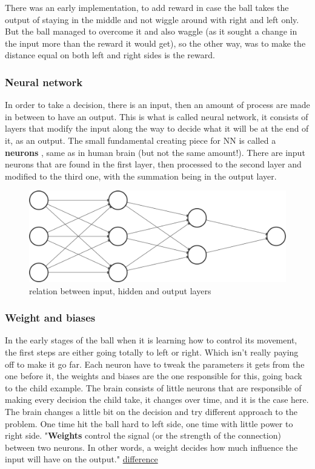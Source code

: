 There was an early implementation, to add reward in case the ball takes the output of staying in the middle and not wiggle around with right and left only. But the ball managed to overcome it and also waggle (as it sought a change in the input more than the reward it would get), so the other way, was to make the distance equal on both left and right sides is the reward.

\subsubsection{Neural network}
In order to take a decision, there is an input, then an amount of process are made in between to have an output. This is what is called neural network, it consists of layers that modify the input along the way to decide what it will be at the end of it, as an output. The small fundamental creating piece for NN is called a \textbf{neurons} , same as in human brain (but not the same amount!). There are input neurons that are found in the first layer, then processed to the second layer and modified to the third one, with the summation being in the output layer.

\begin{figure}
	\centering
	\includegraphics[width=0.7\linewidth]{usedImages/nn}
	\caption{relation between input, hidden and output layers}
	\label{fig:nn}
\end{figure}

\subsubsection{Weight and biases}

In the early stages of the ball when it is learning how to control its movement, the first steps are either going totally to left or right. Which isn't really paying off to make it go far. Each neuron have to tweak the parameters it gets from the one before it, the weights and biases are the one responsible for this, going back to the child example. The brain consists of little neurons that are responsible of making every decision the child take, it changes over time, and it is the case here. The brain changes a little bit on the decision and try different approach to the problem. One time hit the ball hard to left side, one time with little power to right side. "\textbf{Weights} control the signal (or the strength of the connection) between two neurons. In other words, a weight decides how much influence the input will have on the output." \href{https://machine-learning.paperspace.com/wiki/weights-and-biases}{difference}

